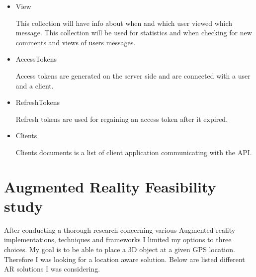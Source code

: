 \documentclass[thesis=M,english]{FITthesis}[2012/10/20]
\begin{document}
\begin{itemize}
\item View

This collection will have info about when and which user viewed which message. This collection will be used for statistics and when checking for new comments and views of users messages.


\item AccessTokens

Access tokens are generated on the server side and are connected with a user and a client.

\item RefreshTokens

Refresh tokens are used for regaining an access token after it expired.

\item Clients

Clients documents is a list of client application communicating with the API. 

\end{itemize}


\section{Augmented Reality Feasibility study}
\label{section:ar}

After conducting a thorough research concerning various Augmented reality implementations, techniques and frameworks I limited my options to three choices. My goal is to be able to place a 3D object at a given GPS location. Therefore I was looking for a location aware solution. Below are listed different AR solutions I was considering.
\end{document}
